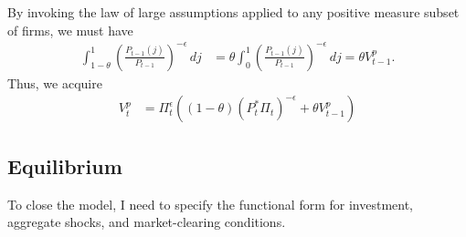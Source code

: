 \documentclass[12 pt, oneside]{article}
\theoremstyle{definition}
\theoremstyle{definition}
\theoremstyle{definition}
\begin{document}
By invoking the law of large assumptions applied to any positive measure subset of firms, we must have
\begin{align*}
  \int_{1 - \theta}^1 \left(\frac{P_{t - 1}(j)}{P_{t - 1}}\right)^{ - \epsilon}\,dj & = \theta\int_0^1 \left(\frac{P_{t - 1}(j)}{P_{t - 1}}\right)^{ - \epsilon}\,dj = \theta V_{t - 1}^p.
\end{align*}
Thus, we acquire
\begin{align}\label{eq:price dispersion evol}
  V_t^p & = \Pi_t^{\epsilon}((1 - \theta) (P_t^* \Pi_t)^{-\epsilon} + \theta V_{t - 1}^p)
\end{align}


\subsection{Equilibrium}
To close the model, I need to specify the functional form for investment, aggregate shocks, and market-clearing conditions.\\
\end{document}
